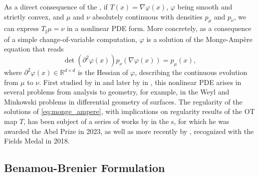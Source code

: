 As a direct consequence of the , if $T(x) = \nabla \varphi(x)$, $\varphi$ being smooth and strictly convex, and $\mu$ and $\nu$ absolutely continuous with densities $p_\mu$ and $p_\nu$, we can express $T_\sharp \mu = \nu$ in a nonlinear \acrfull{PDE} form. More concretely, as a consequence of a simple change-of-variable computation, $\varphi$ is a solution of the Monge-Amp{\`e}re equation that reads
\begin{equation} \label{eq:monge_ampere}
	\operatorname{det}\left(\partial^2 \varphi(x)\right) p_\nu(\nabla \varphi(x))=p_\mu(x),
\end{equation}
where $\partial^2 \varphi(x) \in \mathbb{R}^{d \times d}$ is the Hessian of $\varphi$, describing the continuous evolution from $\mu$ to $\nu$.
First studied by \citeauthor{monge1781histoire} in \citeyear{monge1781histoire} and later by \citeauthor{ampere1819memoire} in \citeyear{ampere1819memoire}, this nonlinear \acrlong{PDE} arises in several problems from analysis to geometry, for example, in the Weyl and Minkowski problems in differential geometry of surfaces. 
The regularity of the solutions of \eqref{eq:monge_ampere}, with implications on regularity results of the \acrlong{OT} map $T$, has been subject of a series of works by \citeauthor{caffarelli1990interior} in the \citeyear{caffarelli1990interior}s, for which he was awarded the Abel Prize in 2023, as well as more recently by \citeauthor{figalli2017monge}, recognized with the Fields Medal in 2018.


\subsection{Benamou-Brenier Formulation} \label{sec:background_benamou_brenier}

